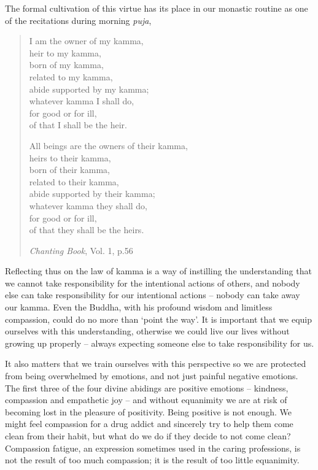 The formal cultivation of this virtue has its place in our monastic
routine as one of the recitations during morning \emph{puja},

\begin{quote}
  I am the owner of my kamma,\\
  heir to my kamma,\\
  born of my kamma,\\
  related to my kamma,\\
  abide supported by my kamma;\\
  whatever kamma I shall do,\\
  for good or for ill,\\
  of that I shall be the heir.

  All beings are the owners of their kamma,\\
  heirs to their kamma,\\
  born of their kamma,\\
  related to their kamma,\\
  abide supported by their kamma;\\
  whatever kamma they shall do,\\
  for good or for ill,\\
  of that they shall be the heirs.

  \emph{Chanting Book}, Vol. 1, p.56\cite{chanting}
\end{quote}

Reflecting thus on the law of kamma is a way of instilling the
understanding that we cannot take responsibility for the intentional
actions of others, and nobody else can take responsibility for our
intentional actions -- nobody can take away our kamma. Even the Buddha,
with his profound wisdom and limitless compassion, could do no more than
`point the way'. It is important that we equip ourselves with this
understanding, otherwise we could live our lives without growing up
properly -- always expecting someone else to take responsibility for us.

It also matters that we train ourselves with this perspective so we are
protected from being overwhelmed by emotions, and not just painful
negative emotions. The first three of the four divine abidings are
positive emotions -- kindness, compassion and empathetic joy -- and
without equanimity we are at risk of becoming lost in the pleasure of
positivity. Being positive is not enough. We might feel compassion for a
drug addict and sincerely try to help them come clean from their habit,
but what do we do if they decide to not come clean? Compassion fatigue,
an expression sometimes used in the caring professions, is not the
result of too much compassion; it is the result of too little
equanimity.

